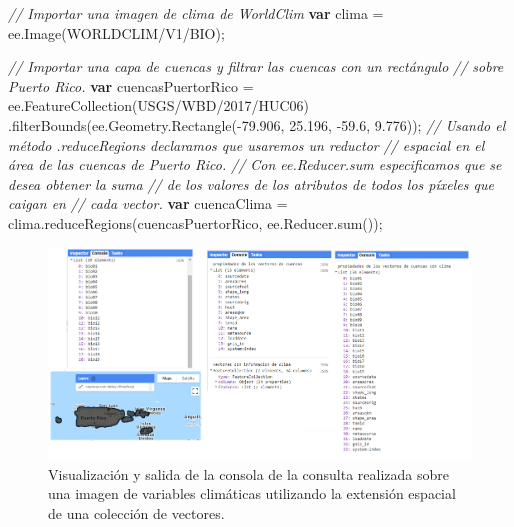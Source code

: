 \documentclass[
  12pt,
  letterpaper,
  twoside]{book}
\newenvironment{Shaded}{\begin{snugshade}}{\end{snugshade}}
\newcommand{\AttributeTok}[1]{\textcolor[rgb]{0.48,0.12,0.64}{#1}}
\newcommand{\CommentTok}[1]{\textcolor[rgb]{0.24,0.58,0.00}{\textit{#1}}}
\newcommand{\ControlFlowTok}[1]{\textcolor[rgb]{0.00,0.00,0.00}{\textbf{#1}}}
\newcommand{\FloatTok}[1]{\textcolor[rgb]{0.28,0.53,0.93}{#1}}
\newcommand{\FunctionTok}[1]{\textcolor[rgb]{0.48,0.12,0.64}{#1}}
\newcommand{\KeywordTok}[1]{\textcolor[rgb]{0.48,0.12,0.64}{#1}}
\newcommand{\NormalTok}[1]{#1}
\newcommand{\OperatorTok}[1]{\textcolor[rgb]{0.00,0.00,0.00}{#1}}
\newcommand{\StringTok}[1]{\textcolor[rgb]{0.87,0.29,0.22}{#1}}
\begin{document}
\begin{Shaded}
\begin{Highlighting}[]
\CommentTok{// Importar una imagen de clima de WorldClim}
\ControlFlowTok{var}\NormalTok{ clima }\OperatorTok{=} \KeywordTok{ee}\OperatorTok{.}\FunctionTok{Image}\NormalTok{(}\StringTok{\textquotesingle{}WORLDCLIM/V1/BIO\textquotesingle{}}\NormalTok{)}\OperatorTok{;}

\CommentTok{// Importar una capa de cuencas y filtrar las cuencas con un rectángulo }
\CommentTok{// sobre Puerto Rico.}
\ControlFlowTok{var}\NormalTok{ cuencasPuertorRico }\OperatorTok{=} \KeywordTok{ee}\OperatorTok{.}\FunctionTok{FeatureCollection}\NormalTok{(}\StringTok{\textquotesingle{}USGS/WBD/2017/HUC06\textquotesingle{}}\NormalTok{)}
  \OperatorTok{.}\FunctionTok{filterBounds}\NormalTok{(}\KeywordTok{ee}\OperatorTok{.}\AttributeTok{Geometry}\OperatorTok{.}\FunctionTok{Rectangle}\NormalTok{(}\OperatorTok{{-}}\FloatTok{79.906}\OperatorTok{,} \FloatTok{25.196}\OperatorTok{,} \OperatorTok{{-}}\FloatTok{59.6}\OperatorTok{,} \FloatTok{9.776}\NormalTok{))}\OperatorTok{;}
\CommentTok{// Usando el método .reduceRegions declaramos que usaremos un reductor }
\CommentTok{// espacial en el área de las cuencas de Puerto Rico.}
\CommentTok{// Con ee.Reducer.sum especificamos que se desea obtener la suma}
\CommentTok{// de los valores de los atributos de todos los píxeles que caigan en }
\CommentTok{// cada vector.}
\ControlFlowTok{var}\NormalTok{ cuencaClima }\OperatorTok{=}\NormalTok{ clima}\OperatorTok{.}\FunctionTok{reduceRegions}\NormalTok{(cuencasPuertorRico}\OperatorTok{,} \KeywordTok{ee}\OperatorTok{.}\AttributeTok{Reducer}\OperatorTok{.}\FunctionTok{sum}\NormalTok{())}\OperatorTok{;}
\end{Highlighting}
\end{Shaded}

\begin{figure}[H]

{\centering \includegraphics[width=0.95\linewidth]{Img/ej23} 

}

\caption{Visualización y salida de la consola de la consulta realizada sobre una imagen de variables climáticas utilizando la extensión espacial de una colección de vectores.}\label{fig:f811}
\end{figure}
\end{document}

